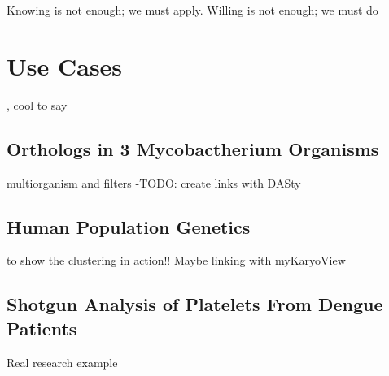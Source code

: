 \begin{savequote}[75mm] 
Knowing is not enough; we must apply. Willing is not enough; we must do
\end{savequote}

\chapter{Use Cases}

, cool to say

\section{Orthologs in 3 Mycobactherium Organisms}
multiorganism and filters -TODO: create links with DASty

\section{Human Population Genetics}
to show the clustering in action!! Maybe linking with myKaryoView

\section{Shotgun Analysis of Platelets From Dengue Patients}
Real research example